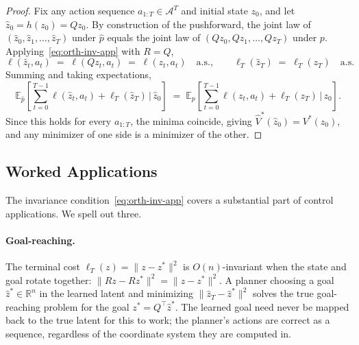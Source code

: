 \begin{proof}
Fix any action sequence $a_{1:T} \in \mathcal{A}^T$ and initial state $z_0$, and let $\hat z_0 = h(z_0) = Q z_0$. By construction of the pushforward, the joint law of $(\hat z_0, \hat z_1, \ldots, \hat z_T)$ under $\hat p$ equals the joint law of $(Q z_0, Q z_1, \ldots, Q z_T)$ under $p$. Applying~\eqref{eq:orth-inv-app} with $R = Q$,
\begin{equation}
    \ell(\hat z_t, a_t) \;=\; \ell(Q z_t, a_t) \;=\; \ell(z_t, a_t) \quad \text{a.s.}, \qquad \ell_T(\hat z_T) \;=\; \ell_T(z_T) \quad \text{a.s.}
\end{equation}
Summing and taking expectations,
\begin{equation}
    \mathbb{E}_{\hat p}\!\left[\sum_{t=0}^{T-1}\ell(\hat z_t, a_t) + \ell_T(\hat z_T) \,\Big|\, \hat z_0\right]
    \;=\; \mathbb{E}_{p}\!\left[\sum_{t=0}^{T-1}\ell(z_t, a_t) + \ell_T(z_T) \,\Big|\, z_0\right].
\end{equation}
Since this holds for every $a_{1:T}$, the minima coincide, giving $\hat V^*(\hat z_0) = V^*(z_0)$, and any minimizer of one side is a minimizer of the other.
\end{proof}

\subsection{Worked Applications}\label{app:planning-instances}

The invariance condition~\eqref{eq:orth-inv-app} covers a substantial part of control applications. We spell out three.

\paragraph{Goal-reaching.}
The terminal cost $\ell_T(z) = \|z - z^*\|^2$ is $O(n)$-invariant when the state and goal rotate together: $\|Rz - Rz^*\|^2 = \|z - z^*\|^2$. A planner choosing a goal $\hat z^* \in \mathbb{R}^n$ in the learned latent and minimizing $\|\hat z_T - \hat z^*\|^2$ solves the true goal-reaching problem for the goal $z^* = Q^\top \hat z^*$. The learned goal need never be mapped back to the true latent for this to work; the planner's actions are correct as a sequence, regardless of the coordinate system they are computed in.

